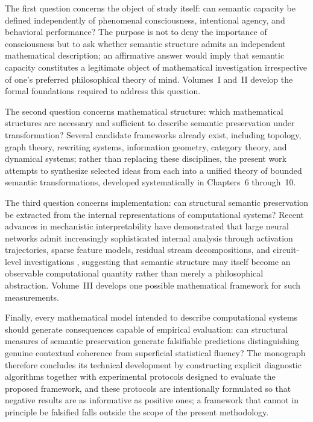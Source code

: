\documentclass[11pt,twoside,openright]{book}
\numberwithin{equation}{chapter}
\theoremstyle{definition}
\theoremstyle{plain}
\theoremstyle{remark}
\theoremstyle{definition}
\begin{document}
The first question concerns the object of study itself: can semantic
capacity be defined independently of phenomenal consciousness, intentional
agency, and behavioral performance? The purpose is not to deny the
importance of consciousness but to ask whether semantic structure admits
an independent mathematical description; an affirmative answer would
imply that semantic capacity constitutes a legitimate object of
mathematical investigation irrespective of one's preferred philosophical
theory of mind. Volumes~I and~II develop the formal foundations required
to address this question.

The second question concerns mathematical structure: which mathematical
structures are necessary and sufficient to describe semantic preservation
under transformation? Several candidate frameworks already exist,
including topology, graph theory, rewriting systems, information
geometry, category theory, and dynamical systems; rather than replacing
these disciplines, the present work attempts to synthesize selected ideas
from each into a unified theory of bounded semantic transformations,
developed systematically in Chapters~6 through~10.

The third question concerns implementation: can structural semantic
preservation be extracted from the internal representations of
computational systems? Recent advances in mechanistic interpretability
have demonstrated that large neural networks admit increasingly
sophisticated internal analysis through activation trajectories, sparse
feature models, residual stream decompositions, and circuit-level
investigations \cite{Olah2020,Elhage2021,Nanda2023}, suggesting that
semantic structure may itself become an observable computational quantity
rather than merely a philosophical abstraction. Volume~III develops one
possible mathematical framework for such measurements.

Finally, every mathematical model intended to describe computational
systems should generate consequences capable of empirical evaluation: can
structural measures of semantic preservation generate falsifiable
predictions distinguishing genuine contextual coherence from superficial
statistical fluency? The monograph therefore concludes its technical
development by constructing explicit diagnostic algorithms together with
experimental protocols designed to evaluate the proposed framework, and
these protocols are intentionally formulated so that negative results are
as informative as positive ones; a framework that cannot in principle be
falsified falls outside the scope of the present methodology.
\end{document}
